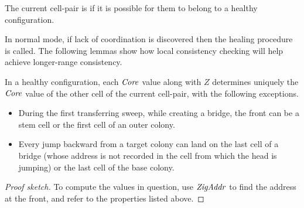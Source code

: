 \documentclass[11pt]{memoir}
\theoremstyle{definition} %
\newtheorem{Premark}{\color{cyan}Peter remark}
\newenvironment{premark}{\begin{Premark}\color{cyan}}{\varqed\end{Premark}}
\newcommand{\fld}[1]{\ensuremath{\textit{#1\/}}}
\newcommand{\Z}{Z} %
\newcommand{\TransferSw}{\mathrm{TransferSw}}
\newcommand{\Last}{\mathrm{Last}}
\newcommand{\Core}{\fld{Core}}
\newcommand{\Sweep}{\fld{Sweep}} %
\newcommand{\ZigAddr}{\fld{ZigAddr}}
\begin{document}
        





\begin{definition}[Coordination] \label{def:coordinated}
   The current cell-pair is  
   if it is possible for them to belong to a healthy configuration.
\end{definition}

In normal mode, if lack of coordination is discovered then the healing procedure is called.
The following lemmas show 
how local consistency checking will help achieve longer-range consistency.

\begin{lemma}\label{lem:coordination1}
  In a healthy configuration, each \( \Core \) 
  value along with \( \Z \) determines uniquely the 
  \( \Core \) value of the other cell of the current cell-pair, with the following exceptions.
  \begin{itemize}
  \item During the first transferring sweep, while
    creating a bridge, the front can be a stem cell or the first cell of an outer colony.
  \item Every jump backward from a target colony can land on the last cell of a 
    bridge (whose address is not recorded in the cell from which the head is jumping)
    or the last cell of the base colony.
  \end{itemize}
  \end{lemma}
  \begin{proof}[Proof sketch]
  To compute the values in question, use \( \ZigAddr \) to find the address at the front, and
  refer to the properties listed above.
  \end{proof}
\end{document}
